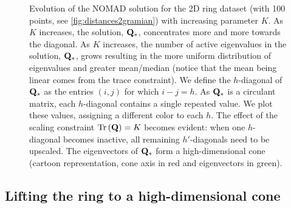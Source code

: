 \documentclass[twoside,11pt]{article}
\begin{document}
\begin{figure}[t]
	\caption{Evolution of the NOMAD solution for the 2D ring dataset (with 100 points, see \cref{fig:distances2gramian}) with increasing parameter $K$. 
		\protect{} As $K$ increases, the solution, ${\mathbf{Q}}_*$, concentrates more and more towards the diagonal.
		\protect{} As $K$ increases, the number of active eigenvalues in the solution, ${\mathbf{Q}}_*$, grows resulting in the more uniform distribution of eigenvalues and greater mean/median (notice that the mean being linear comes from the trace constraint).
		\protect{} 
		We define the $h$-diagonal of ${\mathbf{Q}}_*$ as the entries $(i, j)$ for which $i - j = h$.
		As ${\mathbf{Q}}_*$ is a circulant matrix, each $h$-diagonal contains a single repeated value. We plot these values, assigning a different color to each $h$. The effect of the scaling constraint $\operatorname{Tr}\left({\mathbf{Q}}\right) = K$ becomes evident: when one $h$-diagonal becomes inactive, all remaining $h'$-diagonals need to be upscaled.
		\protect{} The eigenvectors of ${\mathbf{Q}}_*$ form a high-dimensional cone (cartoon representation, cone axis in red and eigenvectors in green).
		}
	\label{fig:ring_k-evolution}
\end{figure}

\subsection{Lifting the ring to a high-dimensional cone}
\end{document}
